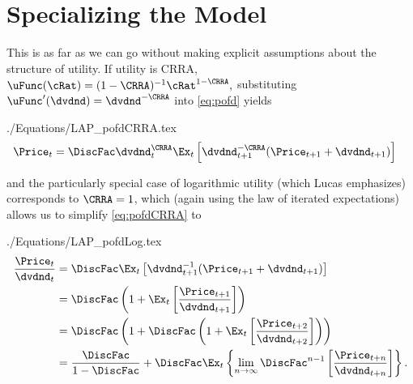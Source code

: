 \documentclass{handout}
\begin{document}
\section{Specializing the Model}

This is as far as we can go without making explicit assumptions about the structure
of utility.  If utility is CRRA, $\uFunc(\cRat)=(1-\CRRA)^{-1}\cRat^{1-\CRRA},$ substituting $\uFunc^{\prime}(\dvdnd)=\dvdnd^{-\CRRA}$ into \eqref{eq:pofd} yields
\begin{verbatimwrite}{./Equations/LAP_pofdCRRA.tex}
\begin{equation}\begin{gathered}\begin{aligned}
 \Price_{t} & =  \DiscFac \dvdnd_{t}^{\CRRA} \Ex_{t}\left[\dvdnd_{t+1}^{-\CRRA}(\Price_{t+1}+\dvdnd_{t+1})\right] \label{eq:pofdCRRA}
\end{aligned}\end{gathered}\end{equation}
\end{verbatimwrite}

and the particularly special case of logarithmic utility (which Lucas emphasizes) corresponds to $\CRRA=1$, which (again using the law of iterated expectations) allows us to simplify \eqref{eq:pofdCRRA} to
\begin{verbatimwrite}{./Equations/LAP_pofdLog.tex}
\begin{equation*}\begin{gathered}\begin{aligned}
\frac{\Price_{t}}{\dvdnd_{t}} & =  \DiscFac \Ex_{t}\left[\dvdnd_{t+1}^{-1}(\Price_{t+1}+\dvdnd_{t+1})\right] \label{eq:pofdLog}
\\ & =  \DiscFac \left(1+\Ex_{t} \left[\frac{{\Price}_{t+1}}{\dvdnd_{t+1}}\right]\right)
\\ & =  \DiscFac \left(1+\DiscFac \left(1+\Ex_{t}\left[\frac{{\Price}_{t+2}}{\dvdnd_{t+2}}\right]\right)\right)
\\ & =  \frac{\DiscFac}{1-\DiscFac} + \DiscFac \Ex_{t}\left\{\lim_{n\rightarrow \infty}\DiscFac^{n-1}\left[\frac{\Price_{t+n}}{\dvdnd_{t+n}}\right]\right\}.
\end{aligned}\end{gathered}\end{equation*}
\end{verbatimwrite}

\end{document}
